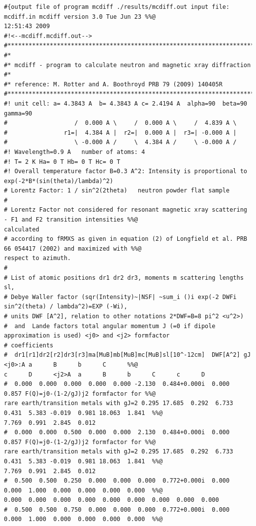 {\footnotesize
\begin{verbatim}
#{output file of program mcdiff ./results/mcdiff.out input file: mcdiff.in mcdiff version 3.0 Tue Jun 23 %%@
12:51:43 2009
#!<--mcdiff.mcdiff.out-->
#***********************************************************************
#*
#* mcdiff - program to calculate neutron and magnetic xray diffraction
#*
#* reference: M. Rotter and A. Boothroyd PRB 79 (2009) 140405R
#***********************************************************************
#! unit cell: a= 4.3843 A  b= 4.3843 A c= 2.4194 A  alpha=90  beta=90 gamma=90
#                   /  0.000 A \     /  0.000 A \     /  4.839 A \ 
#                r1=|  4.384 A |  r2=|  0.000 A |  r3=| -0.000 A |
#                   \ -0.000 A /     \  4.384 A /     \ -0.000 A /
#! Wavelength=0.9 A   number of atoms: 4
#! T= 2 K Ha= 0 T Hb= 0 T Hc= 0 T
#! Overall temperature factor B=0.3 A^2: Intensity is proportional to exp(-2*B*(sin(theta)/lambda)^2)
# Lorentz Factor: 1 / sin^2(2theta)   neutron powder flat sample
#
# Lorentz Factor not considered for resonant magnetic xray scattering - F1 and F2 transition intensities %%@
calculated
# according to fRMXS as given in equation (2) of Longfield et al. PRB 66 054417 (2002) and maximized with %%@
respect to azimuth.
#
# List of atomic positions dr1 dr2 dr3, moments m scattering lengths sl,
# Debye Waller factor (sqr(Intensity)~|NSF| ~sum_i ()i exp(-2 DWFi sin^2(theta) / lambda^2)=EXP (-Wi),
# units DWF [A^2], relation to other notations 2*DWF=B=8 pi^2 <u^2>)
#  and  Lande factors total angular momentum J (=0 if dipole approximation is used) <j0> and <j2> formfactor
# coefficients
#  dr1[r1]dr2[r2]dr3[r3]ma[MuB]mb[MuB]mc[MuB]sl[10^-12cm]  DWF[A^2] gJ     <j0>:A a      B      b      C      %%@
c      D      <j2>A  a      B      b      C      c      D
#  0.000  0.000  0.000  0.000  0.000 -2.130  0.484+0.000i  0.000  0.857 F(Q)=j0-(1-2/gJ)j2 formfactor for %%@
rare earth/transition metals with gJ=2 0.295 17.685  0.292  6.733  0.431  5.383 -0.019  0.981 18.063  1.841  %%@
7.769  0.991  2.845  0.012 
#  0.000  0.000  0.500  0.000  0.000  2.130  0.484+0.000i  0.000  0.857 F(Q)=j0-(1-2/gJ)j2 formfactor for %%@
rare earth/transition metals with gJ=2 0.295 17.685  0.292  6.733  0.431  5.383 -0.019  0.981 18.063  1.841  %%@
7.769  0.991  2.845  0.012 
#  0.500  0.500  0.250  0.000  0.000  0.000  0.772+0.000i  0.000  0.000  1.000  0.000  0.000  0.000  0.000  %%@
0.000  0.000  0.000  0.000  0.000  0.000  0.000  0.000  0.000 
#  0.500  0.500  0.750  0.000  0.000  0.000  0.772+0.000i  0.000  0.000  1.000  0.000  0.000  0.000  0.000  %%@

\end{verbatim}}

